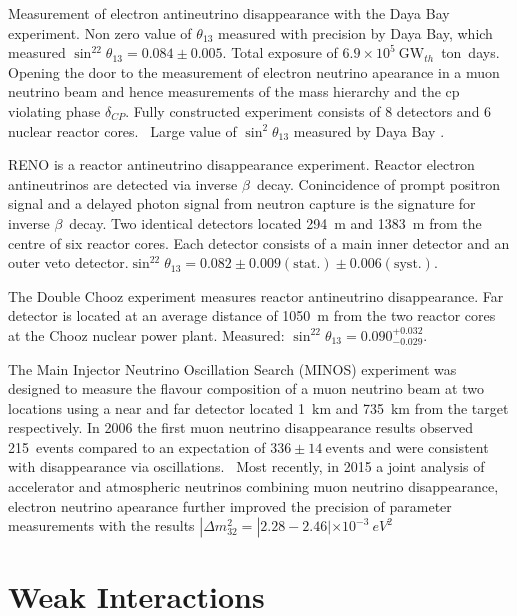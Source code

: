 Measurement of electron antineutrino disappearance with the Daya Bay
experiment. Non zero value of $\theta_{13}$ measured with precision by
Daya Bay, which measured $\sin^22\theta_{13} = 0.084 \pm 0.005$.  
Total exposure of $6.9 \times 10^5~\text{GW}_{th}$~ton~days.
Opening the door to the measurement of electron neutrino 
apearance in a muon neutrino beam and hence measurements of the mass 
hierarchy and the cp violating phase $\delta_{CP}$.
Fully constructed experiment consists of 8 detectors and 6 nuclear
reactor cores.~\cite{DayaBay-PhysRevLett.115.111802}
Large value of $\sin^2\theta_{13}$ measured by Daya Bay \cite{DayaBay2012}.

RENO is a reactor antineutrino disappearance experiment. Reactor
electron antineutrinos are detected via inverse
$\beta$~decay. Conincidence of prompt positron signal and a delayed
photon signal from neutron capture is the signature for inverse $\beta$~decay.
Two identical detectors located 
294~m and 1383~m from the centre of six reactor
cores. Each detector consists of a main inner detector and an outer
veto detector.$\sin^22\theta_{13} = 0.082 \pm 0.009(\text{stat.}) \pm
0.006(\text{syst.})$. \cite{RENO:2015ksa}~\cite{RENO:PhysRevLett.108.191802}

The Double Chooz experiment measures reactor antineutrino
disappearance. 
Far detector is located at an average distance of 1050~m from the two
reactor cores at the Chooz nuclear power plant. 
Measured: 
$\sin^22\theta_{13} = 0.090^{+0.032}_{-0.029}$.~\cite{Abe:2014bwa}   

The Main Injector Neutrino Oscillation Search (MINOS) experiment was
designed to measure the flavour composition of a muon neutrino beam at 
two locations using a near and far detector located 1~km and 735~km
from the target respectively. 
In 2006 the first muon neutrino
disappearance results observed 215~events compared to an expectation
of $336 \pm 14~\text{events}$ and were consistent with disappearance
via oscillations.~\cite{MINOS:PhysRevLett.97.191801}
Most recently, in 2015 a joint analysis of accelerator and atmospheric
neutrinos combining muon neutrino
disappearance, electron neutrino apearance further improved the
precision of parameter measurements with the results 
$|\Delta m^2_{32} = |2.28-2.46| \times 10^{-3}~eV^2$
~\cite{MINOS:PhysRevLett.112.191801} 




\section{Weak Interactions}

